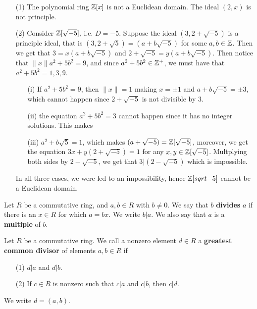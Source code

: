 \begin{example}\label{2.2}
    \begin{enumerate}
        \item[(1)] The polynomial ring $\mathbb{Z}[x]$ is not a Euclidean domain. The
            ideal $(2,x)$ is not principle.

        \item[(2)] Consider $\mathbb{Z}[\sqrt{-5}]$, i.e. $D=-5$. Suppose the ideal
            $(3,2+\sqrt{-5})$ is a principle ideal, that is
            $(3,2+\sqrt{5})=(a+b\sqrt{-5})$ for some $a,b \in \mathbb{Z}$. Then we get
            that $3=x(a+b\sqrt{-5})$ and $2+\sqrt{-5}=y(a+b\sqrt{-5})$. Then
            notice that $\|x\|a^2+5b^2=9$, and since  $a^2+5b^2 \in \mathbb{Z}^+$, we
            must have that $a^2+5b^2=1,3,9$.
            \begin{enumerate}
            \item[(i)] If $a^2+5b^2=9$, then $\|x\|=1$ making $x=\pm 1$ and
                $a+b\sqrt{-5}=\pm3$, which cannot happen since $2+\sqrt{-5}$ is
                not divisible by $3$.

            \item[(ii)] the equation $a^2+5b^2=3$ cannot happen since it has no
                integer solutions. This makes

            \item[(iii)] $a^2+b\sqrt{5}=1$, which makes
                $(a+\sqrt{-5})=\mathbb{Z}[\sqrt{-5}]$, moreover, we get the equation
                $3x+y(2+\sqrt{-5})=1$ for any $x,y \in \mathbb{Z}[\sqrt{-5}]$.
                Multplying both sides by $2-\sqrt{-5}$, we get that
                $3|(2-\sqrt{-5})$ which is impossible.
            \end{enumerate}
            In all three cases, we were led to an impossibility, hence
            $\mathbb{Z}[sqrt{-5}]$ cannot be a Euclidean domain.
    \end{enumerate}
\end{example}

\begin{definition}
    Let $R$ be a commutative ring, and  $a,b \in R$ with  $b \neq 0$. We say
    that $b$ \textbf{divides} $a$ if there is an  $x \in R$ for which  $a=bx$.
    We write  $b|a$. We also say that $a$ is a \textbf{multiple} of $b$.
\end{definition}

\begin{definition}
    Let $R$ be a commutative ring. We call a nonzero element  $d \in R$ a
    \textbf{greatest common divisor} of elements $a,b \in R$ if
    \begin{enumerate}
        \item[(1)] $d|a$ and  $d|b$.

        \item[(2)] If $c \in R$ is nonzero such that  $c|a$ and  $c|b$, then
            $c|d$.
    \end{enumerate}
    We write $d=(a,b)$.
\end{definition}


